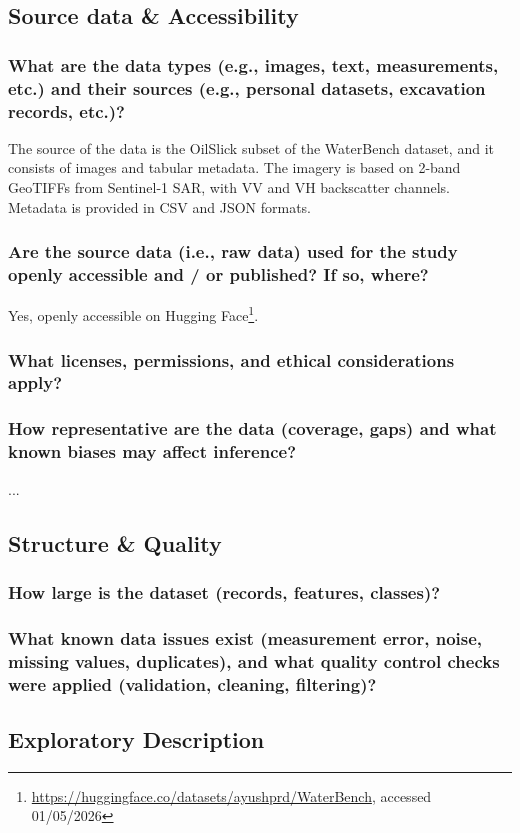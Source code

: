 \documentclass[sigconf]{acmart}
\begin{document}
\subsection{Source data \& Accessibility}
\subsubsection{What are the data types (e.g., images, text, measurements, etc.) and their sources (e.g., personal datasets, excavation records, etc.)?} The source of the data is the OilSlick subset of the WaterBench dataset, and it consists of images and tabular metadata. The imagery is based on 2-band GeoTIFFs from Sentinel-1 SAR, with VV and VH backscatter channels. Metadata is provided in CSV and JSON formats.
\subsubsection{Are the source data (i.e., raw data) used for the study openly accessible and / or published? If so, where?} Yes, openly accessible on Hugging Face\footnote{\url{https://huggingface.co/datasets/ayushprd/WaterBench}, accessed 01/05/2026}.
\subsubsection{What licenses, permissions, and ethical considerations apply?}
\subsubsection{How representative are the data (coverage, gaps) and what known biases may affect inference?} ...

\subsection{Structure \& Quality}
\subsubsection{How large is the dataset (records, features, classes)?}
\subsubsection{What known data issues exist (measurement error, noise, missing values, duplicates), and what quality control checks were applied (validation, cleaning, filtering)?}

\subsection{Exploratory Description}
\end{document}
